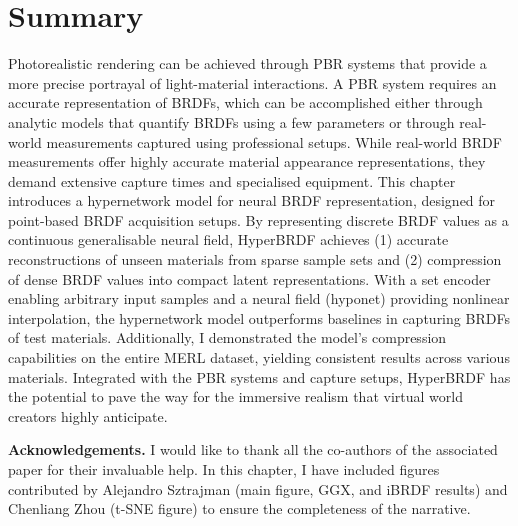 \section{Summary}\label{sec:conc}

Photorealistic rendering can be achieved through \gls{PBR}  systems that provide a more precise portrayal of light-material interactions. A \gls{PBR}  system requires an accurate representation of \gls{BRDF}s, which can be accomplished either through analytic models that quantify \gls{BRDF}s using a few parameters or through real-world measurements captured using professional setups. While real-world \gls{BRDF} measurements offer highly accurate material appearance representations, they demand extensive capture times and specialised equipment. This chapter introduces a hypernetwork model for neural \gls{BRDF} representation, designed for point-based \gls{BRDF} acquisition setups. By representing discrete \gls{BRDF} values as a continuous generalisable neural field, HyperBRDF achieves (1) accurate reconstructions of unseen materials from sparse sample sets and (2) compression of dense \gls{BRDF} values into compact latent representations. With a set encoder enabling arbitrary input samples and a neural field (hyponet) providing nonlinear interpolation, the hypernetwork model outperforms baselines in capturing \gls{BRDF}s of test materials. Additionally, I demonstrated the model's compression capabilities on the entire MERL dataset, yielding consistent results across various materials. Integrated with the \gls{PBR} systems and capture setups, HyperBRDF has the potential to pave the way for the immersive realism that virtual world creators highly anticipate.

\textbf{Acknowledgements.} I would like to thank all the co-authors of the associated paper for their invaluable help. In this chapter, I have included figures contributed by Alejandro Sztrajman (main figure, GGX, and iBRDF results) and Chenliang Zhou (t-SNE figure) to ensure the completeness of the narrative.